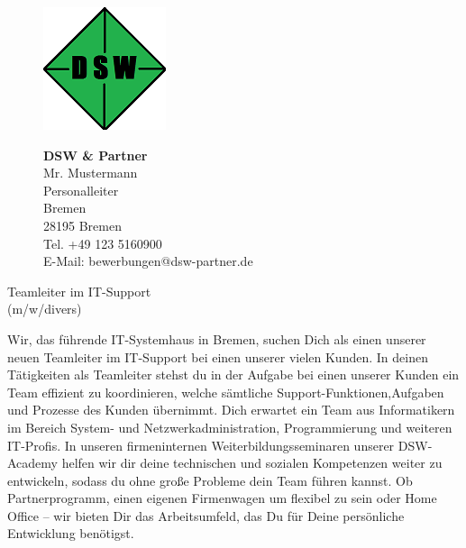 \documentclass[12pt,utf8]{scrartcl}
\begin{document}
\begin{flushleft}
\newpage
\begin{figure}[htbp]
	\begin{minipage}[t]{4cm}
		\vspace{0pt}
		\centering
		\includegraphics{images/Logo}
		\label{fig:Logo}
	\end{minipage}
	\hfill
	\begin{minipage}[t]{4cm}
		\vspace{0pt}
		\scriptsize
		\textbf{DSW \& Partner}\\
		Mr. Mustermann\\
		Personalleiter\\
		Bremen\\
		28195 Bremen\\
		Tel. +49 123 5160900 \\
		E-Mail: bewerbungen@dsw-partner.de
	\end{minipage}
\end{figure}

\large
\begin{center} Teamleiter im IT-Support\\(m/w/divers)\end{center} 

\scriptsize
Wir, das führende IT-Systemhaus in Bremen, suchen Dich als einen unserer neuen Teamleiter im IT-Support bei einen unserer vielen Kunden. In deinen Tätigkeiten als Teamleiter stehst du in der Aufgabe bei einen unserer Kunden ein Team effizient zu koordinieren, welche sämtliche Support-Funktionen,Aufgaben und Prozesse des Kunden übernimmt. Dich erwartet ein Team aus Informatikern im Bereich System- und Netzwerkadministration, Programmierung und weiteren IT-Profis. In unseren firmeninternen Weiterbildungsseminaren unserer DSW-Academy helfen wir dir deine technischen und sozialen Kompetenzen weiter zu entwickeln, sodass du ohne große Probleme dein Team führen kannst. Ob Partnerprogramm, einen eigenen Firmenwagen um flexibel zu sein oder Home Office – wir bieten Dir das Arbeitsumfeld, das Du für Deine persönliche Entwicklung benötigst.



\end{flushleft}
\end{document}
